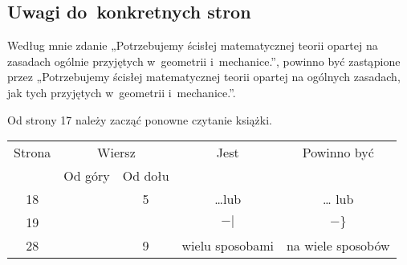 \documentclass[a4paper,11pt]{article}
\numberwithin{equation}{section}
\begin{document}
\label{sec:Feller-Wstep-do-rachunku-ETC}



\subsection{Uwagi do~konkretnych stron}

\label{subsec:Uwagi-do-konkretnych-stron}



\noindent
{} Według mnie zdanie „Potrzebujemy ścisłej
matematycznej teorii opartej na zasadach ogólnie przyjętych w~geometrii
i~mechanice.”, powinno być zastąpione przez „Potrzebujemy ścisłej
matematycznej teorii opartej na ogólnych zasadach, jak tych przyjętych
w~geometrii i~mechanice.”.

{\Large Od strony 17 należy zacząć ponowne czytanie książki.}





\begin{center}

  \begin{tabular}{|c|c|c|c|c|}
    \hline
    Strona & \multicolumn{2}{c|}{Wiersz} & Jest
                              & Powinno być \\ \cline{2-3}
    & Od góry & Od dołu & & \\
    \hline
    18 & & 5 & \ldots lub & \ldots{} lub \\
    19 & & & $- |$ & $- \}$ \\
    28 & & 9 & wielu sposobami & na wiele sposobów \\
    \hline
  \end{tabular}

\end{center}

\VerSpaceSix














\printbibliography





\end{document}
